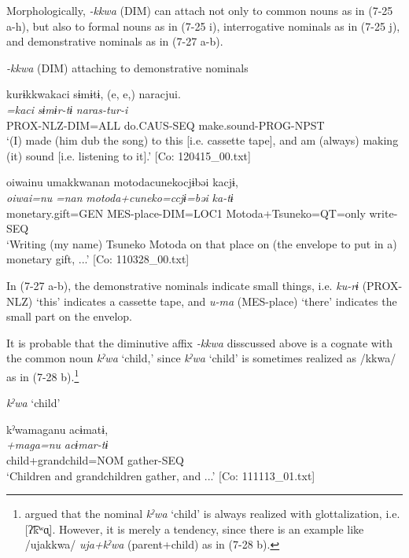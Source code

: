   Morphologically, \textit{{}-kkwa} (DIM) can attach not only to common nouns as in (7-25 a-h), but also to formal nouns as in (7-25 i), interrogative nominals as in (7-25 j), and demonstrative nominals as in (7-27 a-b).

\ea \label{ex:7:27}  \textit{{}-kkwa} (DIM) attaching to demonstrative nominals

\ea \label{ex:7:a}%
\glll  kurɨkkwakaci  sɨmɨtɨ,  (e, e,)  naracjui.\\
\textit{=kaci}  \textit{sɨmɨr-tɨ}    \textit{naras-tur-i}\\
PROX-NLZ-DIM=ALL  do.CAUS-SEQ    make.sound-PROG-NPST\\
\glt ‘(I) made (him dub the song) to this [i.e. cassette tape], and am (always) making (it) sound [i.e. listening to it].’ [Co: 120415\_00.txt]

\ex \label{ex:7:b}%
\glll  {\textbar}oiwai{\textbar}nu  umakkwanan  motodacunekocjɨbəi kacjɨ,    \\
\textit{oiwai=nu}  \textit{=nan}  \textit{motoda+cuneko=ccjɨ=bəi}  \textit{ka-tɨ}\\
monetary.gift=GEN  MES-place-DIM=LOC1  Motoda+Tsuneko=QT=only       write-SEQ    \\
\glt ‘Writing (my name) Tsuneko Motoda on that place on (the envelope to put in a) monetary gift, ...’ [Co: 110328\_00.txt]
\z
\z

In (7-27 a-b), the demonstrative nominals indicate small things, i.e. \textit{ku-rɨ} (PROX-NLZ) ‘this’ indicates a cassette tape, and \textit{u-ma} (MES-place) ‘there’ indicates the small part on the envelop.

  It is probable that the diminutive affix \textit{{}-kkwa} disscussed above is a cognate with the common noun \textit{kˀwa} ‘child,’ since \textit{kˀwa} ‘child’ is sometimes realized as /kkwa/ as in (7-28 b).\footnote{\citet[39]{Niinaga2010} argued that the nominal \textit{kˀwa} ‘child’ is always realized with glottalization, i.e. [ʔ͡kʷɑ̟]. However, it is merely a tendency, since there is an example like /ujakkwa/ \textit{uja+kˀwa} (parent+child) as in (7-28 b).}

\ea \label{ex:7:28}  \textit{kˀwa} ‘child’

\ea \label{ex:7:a}%
\glll  kˀwamaganu  acɨmatɨ,\\
\textit{+maga=nu}  \textit{acɨmar-tɨ}\\
child+grandchild=NOM  gather-SEQ\\
\glt ‘Children and grandchildren gather, and ...’ [Co: 111113\_01.txt]

